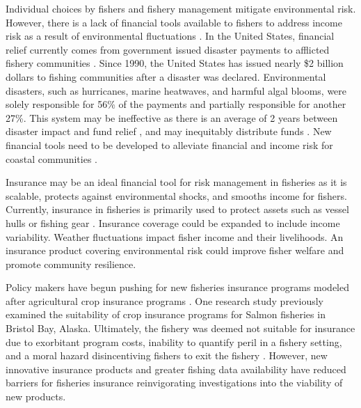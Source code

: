 \documentclass[
  super,
  preprint,
  3p]{elsarticle}
\theoremstyle{plain}
\theoremstyle{plain}
\theoremstyle{remark}
\begin{document}
Individual choices by fishers and fishery management mitigate
environmental risk. However, there is a lack of financial tools
available to fishers to address income risk as a result of environmental
fluctuations \citep{Sethi2010, Kasperski2013}. In the United States,
financial relief currently comes from government issued disaster
payments to afflicted fishery communities \citep{Upton2013}. Since 1990,
the United States has issued nearly \$2 billion dollars to fishing
communities after a disaster was declared. Environmental disasters, such
as hurricanes, marine heatwaves, and harmful algal blooms, were solely
responsible for 56\% of the payments and partially responsible for
another 27\%. This system may be ineffective as there is an average of 2
years between disaster impact and fund relief \citep{Bellquist2021}, and
may inequitably distribute funds \citep{Jardine2020}. New financial
tools need to be developed to alleviate financial and income risk for
coastal communities \citep{sumalia2020, Wabnitz2019}.

Insurance may be an ideal financial tool for risk management in
fisheries as it is scalable, protects against environmental shocks, and
smooths income for fishers. Currently, insurance in fisheries is
primarily used to protect assets such as vessel hulls or fishing gear
\citep{fao2022}. Insurance coverage could be expanded to include income
variability. Weather fluctuations impact fisher income and their
livelihoods. An insurance product covering environmental risk could
improve fisher welfare and promote community resilience.

Policy makers have begun pushing for new fisheries insurance programs
modeled after agricultural crop insurance programs
\citep{Murkowski2022}. One research study previously examined the
suitability of crop insurance programs for Salmon fisheries in Bristol
Bay, Alaska. Ultimately, the fishery was deemed not suitable for
insurance due to exorbitant program costs, inability to quantify peril
in a fishery setting, and a moral hazard disincentiving fishers to exit
the fishery \citep{Herrmann2004}. However, new innovative insurance
products and greater fishing data availability have reduced barriers for
fisheries insurance reinvigorating investigations into the viability of
new products.
\end{document}
